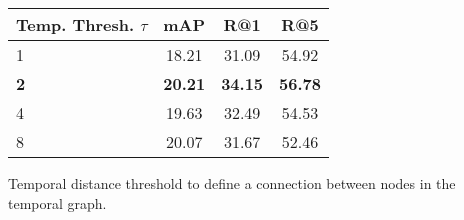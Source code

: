 \begin{table*}[tb]
\begin{minipage}{0.3\textwidth}
\begin{tablenotes}[flushleft]
        \end{tablenotes}
    \end{minipage}%
    \hfill
    \begin{minipage}{0.3\textwidth}
        \footnotesize
        \begin{tabularx}{1.0\textwidth}{@{}Xccc@{}}
            \toprule
            \textbf{Temp. Thresh. $\tau$} & \textbf{mAP}   & \textbf{R@1}   & \textbf{R@5}   \\
            \midrule
            1                             & 18.21          & 31.09          & 54.92          \\
            \textbf{2}                    & \textbf{20.21} & \textbf{34.15} & \textbf{56.78} \\
            4                             & 19.63          & 32.49          & 54.53          \\
            8                             & 20.07          & 31.67          & 52.46          \\
            \bottomrule
        \end{tabularx}
        \begin{tablenotes}[flushleft]
            \scriptsize
            \item \noindent Temporal distance threshold to define a connection between nodes in the temporal graph.
        \end{tablenotes}
    \end{minipage}%
    \hfill
\end{table*}
